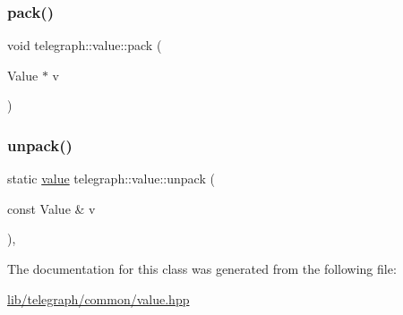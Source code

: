 \subsubsection{\texorpdfstring{pack()}{pack()}}
{\footnotesize\ttfamily void telegraph\+::value\+::pack (\begin{DoxyParamCaption}\item[{Value $\ast$}]{v }\end{DoxyParamCaption})\hspace{0.3cm}{\ttfamily [inline]}}

\mbox{\label{classtelegraph_1_1value_abe64620f91527a2b36310c4ace2a2790}} 
\subsubsection{\texorpdfstring{unpack()}{unpack()}}
{\footnotesize\ttfamily static \hyperlink{classtelegraph_1_1value}{value} telegraph\+::value\+::unpack (\begin{DoxyParamCaption}\item[{const Value \&}]{v }\end{DoxyParamCaption})\hspace{0.3cm}{\ttfamily [inline]}, {\ttfamily [static]}}



The documentation for this class was generated from the following file\+:\begin{DoxyCompactItemize}
\item 
\hyperlink{lib_2telegraph_2common_2value_8hpp}{lib/telegraph/common/value.\+hpp}\end{DoxyCompactItemize}
